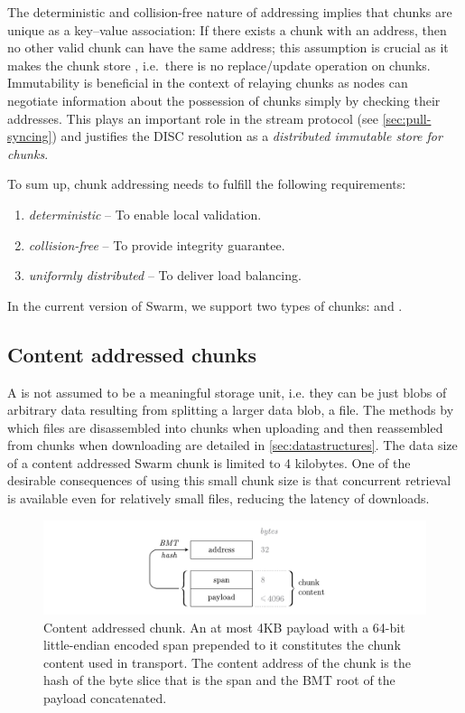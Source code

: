 The deterministic and collision-free nature of addressing implies that chunks are unique as a key--value association: If there exists a chunk with an address, then no other valid chunk can have the same address; this assumption is crucial as it makes the chunk store , i.e.\ there is no replace/update operation on chunks. Immutability is beneficial in the context of relaying chunks as nodes can negotiate information about the possession of chunks simply by checking their addresses. This plays an important role in the stream protocol (see \ref{sec:pull-syncing}) and justifies the DISC resolution as a \emph{distributed immutable store for chunks}.

To sum up, chunk addressing needs to fulfill the following requirements:

\begin{enumerate}
    \item \emph{deterministic} -- To enable local validation.
    \item \emph{collision-free} -- To provide integrity guarantee.
    \item \emph{uniformly distributed} -- To deliver load balancing.
\end{enumerate}

In the current version of Swarm, we support two types of chunks:  and . 

\subsection{Content addressed  chunks\statusgreen}\label{sec:content-addressed-chunks}

A  is not assumed to be a meaningful storage unit, i.e. they can be just blobs of arbitrary data resulting from splitting a larger data blob, a file. The methods by which files are disassembled into chunks when uploading and then reassembled from chunks when downloading are detailed in \ref{sec:datastructures}. The data size of a content addressed Swarm chunk is limited to 4 kilobytes. One of the desirable consequences of using this small chunk size is that concurrent retrieval is available even for relatively small files, reducing the latency of downloads. 

\begin{figure}[htbp]
   \centering
   \includegraphics[width=\textwidth]{fig/content-addressed-chunk-3.pdf}
   \caption[Content addressed chunk\statusgreen]{Content addressed chunk. An at most 4KB payload with a 64-bit little-endian encoded span prepended to it constitutes the chunk content used in transport. The content address of the chunk is the hash of the byte slice that is the span and the BMT root of the payload concatenated.}
   \label{fig:content-addressed-chunk}
\end{figure}

